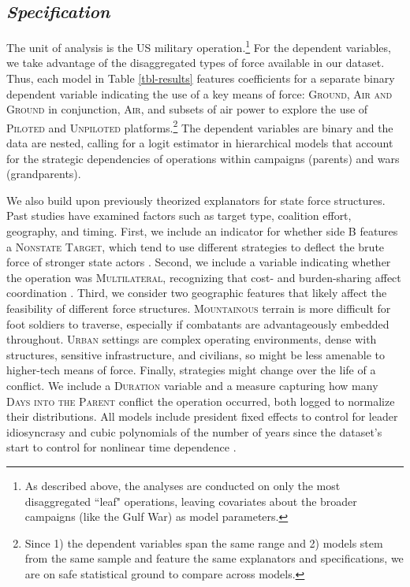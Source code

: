 \documentclass[fleqn,12pt]{article}
\begin{document}
\subsection*{\textit{Specification}}
The unit of analysis is the US military operation.\footnote{As described above, the analyses are conducted on only the most disaggregated ``leaf" operations, leaving covariates about the broader campaigns (like the Gulf War) as model parameters.} For the dependent variables, we take advantage of the disaggregated types of force available in our dataset. Thus, each model in Table \ref{tbl-results} features coefficients for a separate binary dependent variable indicating the use of a key means of force: \textsc{Ground}, \textsc{Air and Ground} in conjunction, \textsc{Air}, and subsets of air power to explore the use of \textsc{Piloted} and \textsc{Unpiloted} platforms.\footnote{Since 1) the dependent variables span the same range and 2) models stem from the same sample and feature the same explanators and specifications, we are on safe statistical ground to compare across models.} The dependent variables are binary and the data are nested, calling for a logit estimator in hierarchical models that account for the strategic dependencies of operations within campaigns (parents) and wars (grandparents).

We also build upon previously theorized explanators for state force structures. Past studies have examined factors such as target type, coalition effort, geography, and timing. First, we include an indicator for whether side B features a \textsc{Nonstate Target}, which tend to use different strategies to deflect the brute force of stronger state actors \citep{Arreguin01}. Second, we include a variable indicating whether the operation was \textsc{Multilateral}, recognizing that cost- and burden-sharing affect coordination \citep{CZGrayer22}. Third, we consider two geographic features that likely affect the feasibility of different force structures. \textsc{Mountainous} terrain is more difficult for foot soldiers to traverse, especially if combatants are advantageously embedded throughout. \textsc{Urban} settings are complex operating environments, dense with structures, sensitive infrastructure, and civilians, so might be less amenable to higher-tech means of force. Finally, strategies might change over the life of a conflict. We include a \textsc{Duration} variable and a measure capturing how many \textsc{Days into the Parent} conflict the operation occurred, both logged to normalize their distributions. All models include president fixed effects to control for leader idiosyncrasy and cubic polynomials of the number of years since the dataset's start to control for nonlinear time dependence \citep{CarterSignorino10}.
\end{document}
